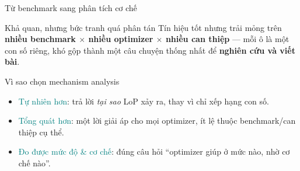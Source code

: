 \documentclass[8pt,aspectratio=169]{beamer}
\newcommand{\hl}[1]{\textcolor{accent}{\textbf{#1}}}
\newcommand{\tc}[1]{\textcolor{teal}{#1}}
\newcommand{\bad}[1]{\textcolor{highlight}{\textbf{#1}}}
\newcommand{\good}[1]{\textcolor{proposegreen}{\textbf{#1}}}
\begin{document}
\begin{frame}{Từ benchmark sang phân tích cơ chế}
\vspace{0.2em}
\begin{alertblock}{Khả quan, nhưng bức tranh quá phân tán}
\small
Tín hiệu tốt nhưng trải mỏng trên \hl{nhiều benchmark $\times$ nhiều optimizer $\times$ nhiều can thiệp} --- mỗi ô là một con số riêng, khó gộp thành một câu chuyện thống nhất để \textbf{nghiên cứu và viết bài}.
\end{alertblock}

\vspace{0.6em}
\centering
{}

\vspace{0.6em}
\begin{exampleblock}{Vì sao chọn mechanism analysis}
\small
\begin{itemize}\setlength\itemsep{1pt}
\item \tc{Tự nhiên hơn}: trả lời \emph{tại sao} LoP xảy ra, thay vì chỉ xếp hạng con số.
\item \tc{Tổng quát hơn}: một lời giải áp cho mọi optimizer, ít lệ thuộc benchmark/can thiệp cụ thể.
\item \tc{Đo được mức độ \& cơ chế}: đúng câu hỏi ``optimizer giúp ở mức nào, nhờ cơ chế nào''.
\end{itemize}
\end{exampleblock}
\end{frame}
\end{document}
